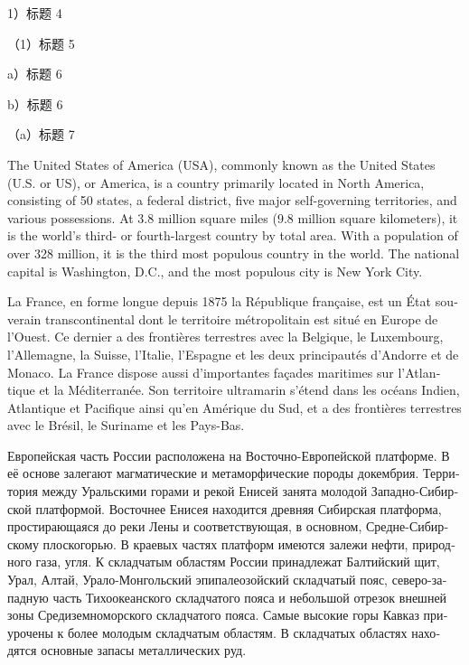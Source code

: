 


1）标题 4

（1）标题 5

a）标题 6

b）标题 6

（a）标题 7


The United States of America (USA), commonly known as the United States (U.S. or US), or America, is a country primarily located in North America, consisting of 50 states, a federal district, five major self-governing territories, and various possessions. At 3.8 million square miles (9.8 million square kilometers), it is the world's third- or fourth-largest country by total area. With a population of over 328 million, it is the third most populous country in the world. The national capital is Washington, D.C., and the most populous city is New York City.

\begin{otherlanguage}{french}
La France, en forme longue depuis 1875 la République française, est un État souverain transcontinental dont le territoire métropolitain est situé en Europe de l'Ouest. Ce dernier a des frontières terrestres avec la Belgique, le Luxembourg, l'Allemagne, la Suisse, l'Italie, l'Espagne et les deux principautés d'Andorre et de Monaco. La France dispose aussi d'importantes façades maritimes sur l'Atlantique et la Méditerranée. Son territoire ultramarin s'étend dans les océans Indien, Atlantique et Pacifique ainsi qu'en Amérique du Sud, et a des frontières terrestres avec le Brésil, le Suriname et les Pays-Bas.
\end{otherlanguage}

\begin{otherlanguage}{russian}
Европейская часть России расположена на Восточно-Европейской платформе. В её основе залегают магматические и метаморфические породы докембрия. Территория между Уральскими горами и рекой Енисей занята молодой Западно-Сибирской платформой. Восточнее Енисея находится древняя Сибирская платформа, простирающаяся до реки Лены и соответствующая, в основном, Средне-Сибирскому плоскогорью. В краевых частях платформ имеются залежи нефти, природного газа, угля. К складчатым областям России принадлежат Балтийский щит, Урал, Алтай, Урало-Монгольский эпипалеозойский складчатый пояс, северо-западную часть Тихоокеанского складчатого пояса и небольшой отрезок внешней зоны Средиземноморского складчатого пояса. Самые высокие горы Кавказ приурочены к более молодым складчатым областям. В складчатых областях находятся основные запасы металлических руд.
\end{otherlanguage}

